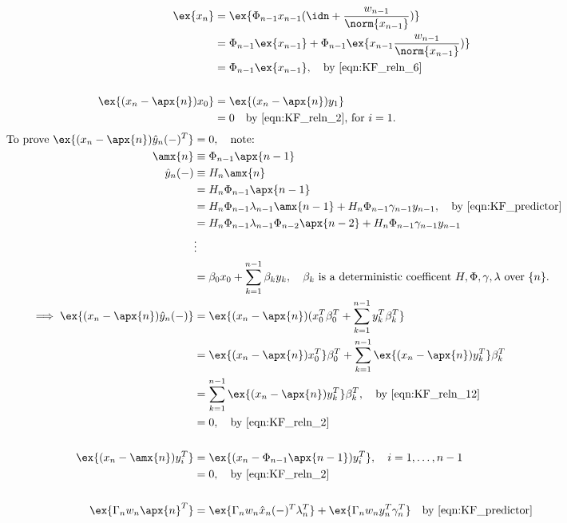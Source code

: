 \begin{align}
\ex{x_n} &= \ex{\Phi_{n-1}x_{n-1}(\idn + \frac{w_{n-1}}{\norm{x_{n-1}}})} \\
&= \Phi_{n-1}\ex{x_{n-1}} + \Phi_{n-1}\ex{x_{n-1}\frac{w_{n-1}}{\norm{x_{n-1}}})} \\
&= \Phi_{n-1}\ex{x_{n-1}}, \quad \text{by \ref{eqn:KF_reln_6}} \\
\nonumber \\ 
\ex{(x_n - \apx{n})x_0} &= \ex{(x_n - \apx{n})y_1} \\
&= 0 \quad \text{by \ref{eqn:KF_reln_2}, for $i=1$.}
\end{align}
\begin{align}
\text{To prove } \ex{(x_n - \apx{n})\hat{y}_n(-)^T} &=0, \quad \text{note:} \\
\amx{n} & \equiv \Phi_{n-1} \apx{n-1} \label{eqn:amx}\\
\hat{y}_n(-) & \equiv H_n \amx{n} \\
&= H_n \Phi_{n-1} \apx{n-1} \\
&= H_n \Phi_{n-1} \lambda_{n-1} \amx{n-1} + H_n \Phi_{n-1} \gamma_{n-1} y_{n-1}, \quad \text{by \ref{eqn:KF_predictor}} \\
&= H_n \Phi_{n-1} \lambda_{n-1} \Phi_{n-2} \apx{n-2} + H_n \Phi_{n-1} \gamma_{n-1} y_{n-1} \\
&\vdots \nonumber \\
& = \beta_0 x_0 + \sum_{k=1}^{n-1} \beta_k y_k, \quad \text{$\beta_k$ is a deterministic coefficent $H, \Phi, \gamma, \lambda$ over $\{n\}$.}\\
\implies \ex{(x_n - \apx{n})\hat{y}_n(-)} &= \ex{(x_n - \apx{n})(x_0^T\beta_0^T  + \sum_{k=1}^{n-1} y_k^T \beta_k^T } \\
&= \ex{(x_n - \apx{n})x_0^T}\beta_0^T  + \sum_{k=1}^{n-1} \ex{(x_n - \apx{n})y_k^T} \beta_k^T  \\
&= \sum_{k=1}^{n-1} \ex{(x_n - \apx{n})y_k^T} \beta_k^T, \quad \text{by \ref{eqn:KF_reln_12}}\\
&=0, \quad \text{by \ref{eqn:KF_reln_2}} \\
\nonumber \\ 
\ex{(x_n - \amx{n})y_i^T} &= \ex{(x_n - \Phi_{n-1} \apx{n-1})y_i^T}, \quad i = 1,\dots,n-1 \\
&=0, \quad \text{by \ref{eqn:KF_reln_2}} \\
\nonumber \\
\ex{\Gamma_n w_n \apx{n}^T} &=\ex{\Gamma_n w_n  \hat{x}_n(-)^T \lambda_n^T} +  \ex{\Gamma_n w_n  y_n^T \gamma_n^T} \quad \text{by \ref{eqn:KF_predictor}}\\

\end{align}
